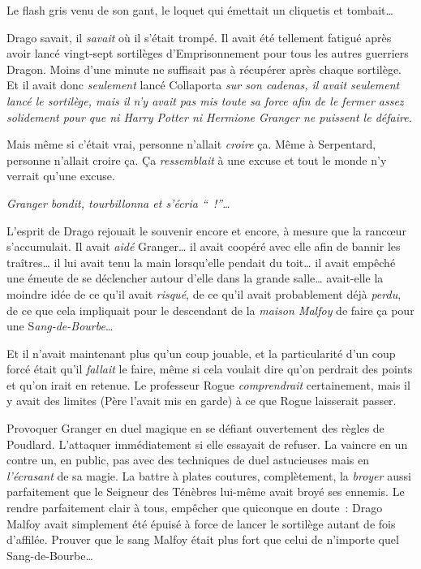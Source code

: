 Le flash gris venu de son gant, le loquet qui émettait un cliquetis et tombait…

Drago savait, il \emph{savait} où il s'était trompé. Il avait été tellement fatigué après avoir lancé vingt-sept sortilèges d'Emprisonnement pour tous les autres guerriers Dragon. Moins d'une minute ne suffisait pas à récupérer après chaque sortilège. Et il avait donc \emph{seulement} lancé Collaporta \emph{sur son cadenas, il avait seulement lancé le sortilège, mais il n'y avait pas mis toute sa force afin de le fermer assez solidement pour que ni Harry Potter ni Hermione Granger ne puissent le défaire.}

Mais même si c'était vrai, personne n'allait \emph{croire} ça. Même à Serpentard, personne n'allait croire ça. Ça \emph{ressemblait} à une excuse et tout le monde n'y verrait qu'une excuse.

\emph{Granger bondit, tourbillonna et s'écria “~!”…}

L'esprit de Drago rejouait le souvenir encore et encore, à mesure que la rancœur s'accumulait. Il avait \emph{aidé} Granger… il avait coopéré avec elle afin de bannir les traîtres… il lui avait tenu la main lorsqu'elle pendait du toit… il avait empêché une émeute de se déclencher autour d'elle dans la grande salle… avait-elle la moindre idée de ce qu'il avait \emph{risqué}, de ce qu'il avait probablement déjà \emph{perdu}, de ce que cela impliquait pour le descendant de la \emph{maison Malfoy} de faire ça pour une S\emph{ang-de-Bourbe}…

Et il n'avait maintenant plus qu'un coup jouable, et la particularité d'un coup forcé était qu'il \emph{fallait} le faire, même si cela voulait dire qu'on perdrait des points et qu'on irait en retenue. Le professeur Rogue \emph{comprendrait} certainement, mais il y avait des limites (Père l'avait mis en garde) à ce que Rogue laisserait passer.

Provoquer Granger en duel magique en se défiant ouvertement des règles de Poudlard. L'attaquer immédiatement si elle essayait de refuser. La vaincre en un contre un, en public, pas avec des techniques de duel astucieuses mais en \emph{l'écrasant} de sa magie. La battre à plates coutures, complètement, la \emph{broyer} aussi parfaitement que le Seigneur des Ténèbres lui-même avait broyé ses ennemis. Le rendre parfaitement clair à tous, empêcher que quiconque en doute~: Drago Malfoy avait simplement été épuisé à force de lancer le sortilège autant de fois d'affilée. Prouver que le sang Malfoy était plus fort que celui de n'importe quel Sang-de-Bourbe…

